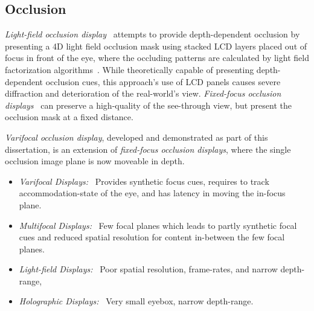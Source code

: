 \subsection{Occlusion}
\label{sec:related_work:occlusion}

\emph{Light-field occlusion display}~\cite{Maimone2013} attempts to provide depth-dependent occlusion by presenting a 4D light field occlusion mask using stacked LCD layers placed out of focus in front of the eye, where the occluding patterns are calculated by light field factorization algorithms~\cite{Lanman2010, Wetzstein2012}. While theoretically capable of presenting depth-dependent occlusion cues, this approach's use of LCD panels causes severe diffraction and deterioration of the real-world's view. \emph{Fixed-focus occlusion displays}~\cite{Kiyokawa2003} can preserve a high-quality of the see-through view, but present the occlusion mask at a fixed distance.
 

\emph{Varifocal occlusion display}, developed and demonstrated as part of this dissertation, is an extension of \emph{fixed-focus occlusion displays}, where the single occlusion image plane is now moveable in depth.



\begin{comment}
\section{Literature on the importance of depth cues for AR displays}

\cite{sielhorst2008advanced} provide a good set of references on depth perception studies. \cite{sielhorst2008advanced} also provide a good summary of \cite{cutting1995perceiving} which in turn is a seminal paper about the different types of depth cues and their relative importance. The summary: Occlusion is the most important depth cue even though it is only an  because because it can only reveal the order but not a relative or absolute distance. \cite{sielhorst2008advanced} call it ``interposition''. \cite{sielhorst2008advanced}.
\end{comment}

\begin{itemize}
\item \emph{Varifocal Displays:}~\cite{Dunn2017Wide,Aksit2017Near} Provides synthetic focus cues, requires to track accommodation-state of the eye, and has latency in moving the in-focus plane.
\item \emph{Multifocal Displays:}~\cite{Akeley2004,Narain2015optimal} Few focal planes which leads to partly synthetic focal cues and reduced spatial resolution for content in-between the few focal planes.
\item \emph{Light-field Displays:}~\cite{Maimone2014} Poor spatial resolution, frame-rates, and narrow depth-range,
\item \emph{Holographic Displays:}~\cite{Maimone2017Holographic} Very small eyebox, narrow depth-range.
\end{itemize}
